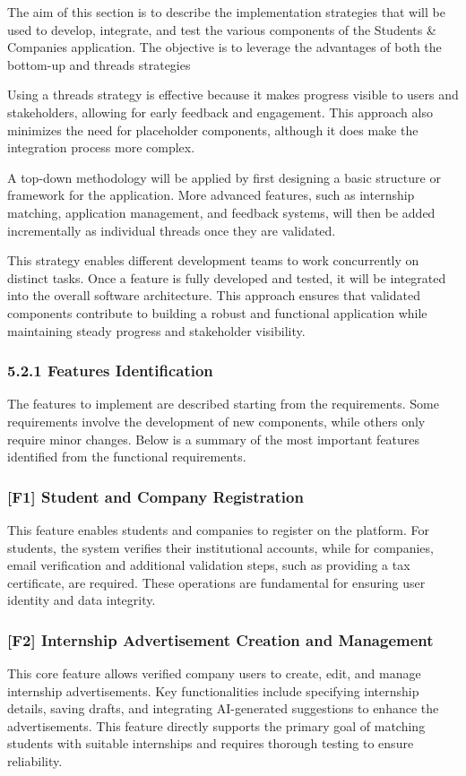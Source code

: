 The aim of this section is to describe the implementation strategies that will be used to develop, integrate, and test the various components of the Students \& Companies application. The objective is to leverage the advantages of both the bottom-up and threads strategies

Using a threads strategy is effective because it makes progress visible to users and stakeholders, allowing for early feedback and engagement. This approach also minimizes the need for placeholder components, although it does make the integration process more complex.

A top-down methodology will be applied by first designing a basic structure or framework for the application. More advanced features, such as internship matching, application management, and feedback systems, will then be added incrementally as individual threads once they are validated.

This strategy enables different development teams to work concurrently on distinct tasks. Once a feature is fully developed and tested, it will be integrated into the overall software architecture. This approach ensures that validated components contribute to building a robust and functional application while maintaining steady progress and stakeholder visibility.

\subsubsection*{5.2.1 Features Identification}
The features to implement are described starting from the requirements. Some requirements involve the development of new components, while others only require minor changes. Below is a summary of the most important features identified from the functional requirements.

\subsubsection*{[F1] Student and Company Registration}
This feature enables students and companies to register on the platform. For students, the system verifies their institutional accounts, while for companies, email verification and additional validation steps, such as providing a tax certificate, are required. These operations are fundamental for ensuring user identity and data integrity.

\subsubsection*{[F2] Internship Advertisement Creation and Management}
This core feature allows verified company users to create, edit, and manage internship advertisements. Key functionalities include specifying internship details, saving drafts, and integrating AI-generated suggestions to enhance the advertisements. This feature directly supports the primary goal of matching students with suitable internships and requires thorough testing to ensure reliability.

